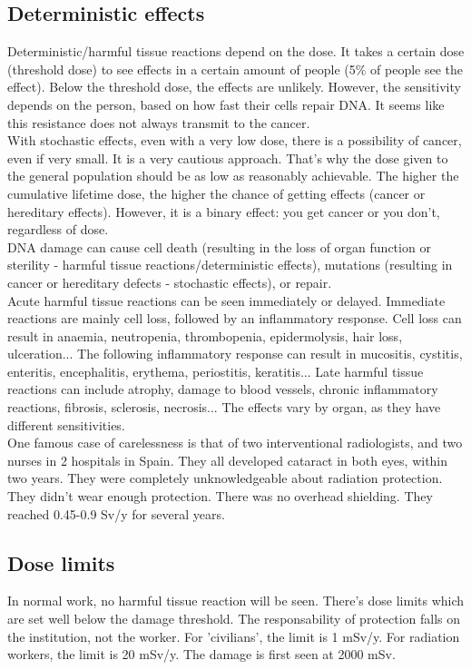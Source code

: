 \subsection{Deterministic effects}
Deterministic/harmful tissue reactions depend on the dose. It takes a certain dose (threshold dose) to see effects in a certain amount of people (5\% of people see the effect). Below the threshold dose, the effects are unlikely. However, the sensitivity depends on the person, based on how fast their cells repair DNA. It seems like this resistance does not always transmit to the cancer.\\
With stochastic effects, even with a very low dose, there is a possibility of cancer, even if very small. It is a very cautious approach. That's why the dose given to the general population should be as low as reasonably achievable. The higher the cumulative lifetime dose, the higher the chance of getting effects (cancer or hereditary effects). However, it is a binary effect: you get cancer or you don't, regardless of dose.\\
DNA damage can cause cell death (resulting in the loss of organ function or sterility - harmful tissue reactions/deterministic effects), mutations (resulting in cancer or hereditary defects - stochastic effects), or repair. \\
Acute harmful tissue reactions can be seen immediately or delayed. Immediate reactions  are mainly cell loss, followed by an inflammatory response. Cell loss can result in anaemia, neutropenia, thrombopenia, epidermolysis, hair loss, ulceration... The following inflammatory response can result in mucositis, cystitis, enteritis, encephalitis, erythema, periostitis, keratitis... Late harmful tissue reactions can include atrophy, damage to blood vessels, chronic inflammatory reactions, fibrosis, sclerosis, necrosis... The effects vary by organ, as they have different sensitivities.\\
One famous case of carelessness is that of two interventional radiologists, and two nurses in 2 hospitals in Spain. They all developed cataract in both eyes, within two years. They were completely unknowledgeable about radiation protection. They didn't wear enough protection. There was no overhead shielding. They reached 0.45-0.9 Sv/y for several years.\\

\subsection{Dose limits}
In normal work, no harmful tissue reaction will be seen. There's dose limits which are set well below the damage threshold. The responsability of protection falls on the institution, not the worker. For 'civilians', the limit is 1 mSv/y. For radiation workers, the limit is 20 mSv/y. The damage is first seen at 2000 mSv.\\
